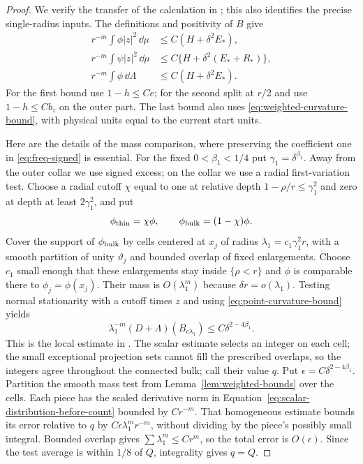 \begin{proof}
We verify the transfer of the calculation in
\cite[Lemmas~8.1--8.2]{AE}; this also identifies the precise
single-radius inputs. The definitions and positivity of $B$ give
\begin{equation}\label{eq:weighted-height-comparisons}
 \begin{aligned}
 r^{-m}\int\phi|z|^2\,\dd\mu&\le C(H+\delta^2E_*),\\
 r^{-m}\int\psi|z|^2\,\dd\mu
     &\le C\{H+\delta^2(E_*+R_*)\},\\
 r^{-m}\int\phi\,\dd\Lambda&\le C(H+\delta^2E_*).
 \end{aligned}
\end{equation}
For the first bound use $1-h\le Ce$; for the second split at $r/2$
and use $1-h\le Cb_z$ on the outer part. The last bound also uses
\eqref{eq:weighted-curvature-bound}, with physical units equal to the
current start units.

Here are the details of the mass comparison, where preserving the
coefficient one in \eqref{eq:freq-signed} is essential. For the fixed
$0<\beta_1<1/4$ put $\gamma_1=\delta^{\beta_1}$. Away from the
outer collar we use signed excess; on the collar we use a radial
first-variation test. Choose a radial cutoff $\chi$ equal to one at
relative depth $1-\rho/r\le\gamma_1^2$ and zero at depth at least
$2\gamma_1^2$, and put
\[
 \phi_{\rm thin}=\chi\phi,\qquad
 \phi_{\rm bulk}=(1-\chi)\phi.
\]
Cover the support of $\phi_{\rm bulk}$ by cells centered at $x_j$ of
radius $\lambda_1=c_1\gamma_1^2r$, with a smooth partition of unity
$\vartheta_j$ and bounded overlap of fixed enlargements. Choose $c_1$
small enough that these enlargements stay inside $\{\rho<r\}$ and
$\phi$ is comparable there to $\phi_j=\phi(x_j)$. Their mass is
$O(\lambda_1^m)$ because
$\delta r=o(\lambda_1)$. Testing normal stationarity with a cutoff
times $z$ and using \eqref{eq:point-curvature-bound} yields
\[
 \lambda_1^{-m}(D+\Lambda)(B_{c\lambda_1})
                    \le C\delta^{2-4\beta_1}.
\]
This is the local estimate in \cite[Equation~(8.6)]{AE}.
The scalar estimate selects an integer on each cell; the small
exceptional projection sets cannot fill the prescribed overlaps, so
the integers agree throughout the connected bulk; call their value $q$.
Put $\epsilon=C\delta^{2-4\beta_1}$.
Partition the smooth mass test from Lemma~\ref{lem:weighted-bounds}
over the cells. Each piece has the scaled derivative norm in
Equation~\eqref{eq:scalar-distribution-before-count} bounded by
$Cr^{-m}$. That homogeneous estimate bounds its error relative to $q$
by $C\epsilon\lambda_1^m r^{-m}$, without dividing by the piece's
possibly small integral. Bounded overlap gives
$\sum\lambda_1^m\le Cr^m$, so the total error is $O(\epsilon)$.
Since the test average is within $1/8$ of $Q$, integrality gives $q=Q$.


\end{proof}
